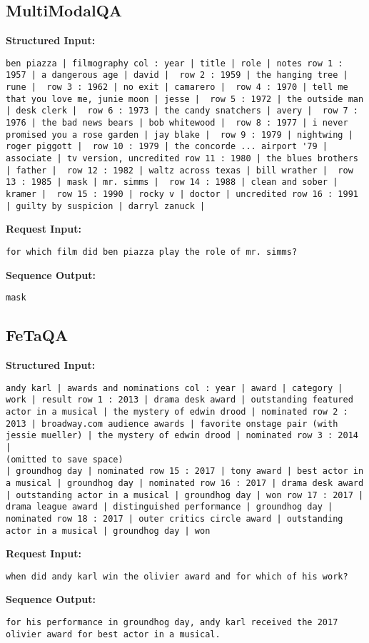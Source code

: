 \documentclass[11pt]{article}
\begin{document}
\subsection{MultiModalQA}
\textbf{Structured Input:} 
\begin{lstlisting}
ben piazza | filmography col : year | title | role | notes row 1 : 1957 | a dangerous age | david |  row 2 : 1959 | the hanging tree | rune |  row 3 : 1962 | no exit | camarero |  row 4 : 1970 | tell me that you love me, junie moon | jesse |  row 5 : 1972 | the outside man | desk clerk |  row 6 : 1973 | the candy snatchers | avery |  row 7 : 1976 | the bad news bears | bob whitewood |  row 8 : 1977 | i never promised you a rose garden | jay blake |  row 9 : 1979 | nightwing | roger piggott |  row 10 : 1979 | the concorde ... airport '79 | associate | tv version, uncredited row 11 : 1980 | the blues brothers | father |  row 12 : 1982 | waltz across texas | bill wrather |  row 13 : 1985 | mask | mr. simms |  row 14 : 1988 | clean and sober | kramer |  row 15 : 1990 | rocky v | doctor | uncredited row 16 : 1991 | guilty by suspicion | darryl zanuck |
\end{lstlisting}
\textbf{Request Input:} 
\begin{lstlisting}
for which film did ben piazza play the role of mr. simms?
\end{lstlisting}
\textbf{Sequence Output:} 
\begin{lstlisting}
mask
\end{lstlisting}

\subsection{FeTaQA}
\textbf{Structured Input:} 
\begin{lstlisting}
andy karl | awards and nominations col : year | award | category | work | result row 1 : 2013 | drama desk award | outstanding featured actor in a musical | the mystery of edwin drood | nominated row 2 : 2013 | broadway.com audience awards | favorite onstage pair (with jessie mueller) | the mystery of edwin drood | nominated row 3 : 2014 |
(omitted to save space)
| groundhog day | nominated row 15 : 2017 | tony award | best actor in a musical | groundhog day | nominated row 16 : 2017 | drama desk award | outstanding actor in a musical | groundhog day | won row 17 : 2017 | drama league award | distinguished performance | groundhog day | nominated row 18 : 2017 | outer critics circle award | outstanding actor in a musical | groundhog day | won
\end{lstlisting}
\textbf{Request Input:} 
\begin{lstlisting}
when did andy karl win the olivier award and for which of his work?
\end{lstlisting}
\textbf{Sequence Output:} 
\begin{lstlisting}
for his performance in groundhog day, andy karl received the 2017 olivier award for best actor in a musical.
\end{lstlisting}
\end{document}
